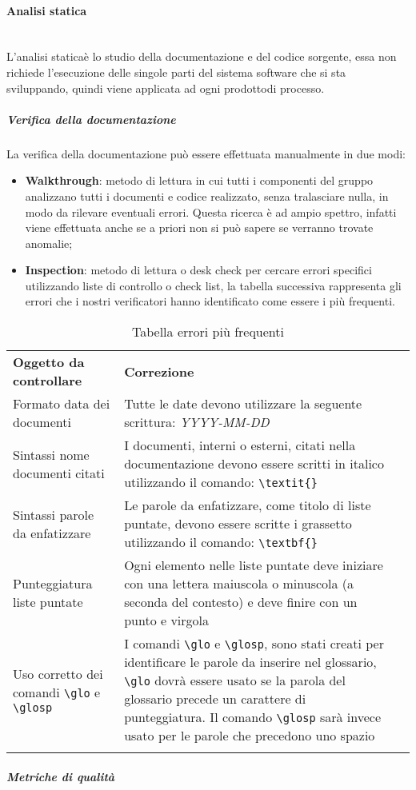 \paragraph{Analisi statica}\mbox{}\\ [1mm]
L'analisi statica\glosp è lo studio della documentazione e del codice sorgente, essa non richiede l'esecuzione delle singole parti del sistema software che si sta sviluppando, quindi viene applicata ad ogni prodotto\glosp di processo\glo.
\subparagraph*{Verifica della documentazione} 
La verifica della documentazione può essere effettuata manualmente in due modi:
\begin{itemize}
	\item \textbf{Walkthrough}: metodo di lettura in cui tutti i componenti del gruppo analizzano tutti i documenti e codice realizzato, senza tralasciare nulla, in modo da rilevare eventuali errori. Questa ricerca è ad ampio spettro, infatti viene effettuata anche se a priori non si può sapere se verranno trovate anomalie;
	\item \textbf{Inspection}: metodo di lettura o desk check per cercare errori specifici utilizzando liste di controllo o check list, la tabella successiva rappresenta gli errori che i nostri verificatori hanno identificato come essere i più frequenti.
\end{itemize}
\setcounter{table}{0}
\begin{longtable} {
		>{}p{55mm} 
		>{}p{55mm}
		>{}p{0mm}}
	\rowcolor{gray!50}
	\textbf{Oggetto da controllare} & \textbf{Correzione} & \TBstrut \\[2mm]
	Formato data dei documenti & Tutte le date devono utilizzare la seguente scrittura: \textit{YYYY-MM-DD}  &  \TBstrut \\[2mm]
	Sintassi nome documenti citati & I documenti, interni o esterni, citati nella documentazione devono essere scritti in italico utilizzando il comando: \verb|\textit{}|  &  \TBstrut \\[2mm]
	Sintassi parole da enfatizzare & Le parole da enfatizzare, come titolo di liste puntate, devono essere scritte i grassetto utilizzando il comando: \verb|\textbf{}|  &  \TBstrut \\[2mm]
	Punteggiatura liste puntate & Ogni elemento nelle liste puntate deve iniziare con una lettera maiuscola o minuscola (a seconda del contesto) e deve finire con un punto e virgola &  \TBstrut \\[2mm]
	Uso corretto dei comandi \verb|\glo| e \verb|\glosp| & I comandi \verb|\glo| e \verb|\glosp|, sono stati creati per identificare le parole da inserire nel glossario, \verb|\glo| dovrà essere usato se la parola del glossario precede un carattere di punteggiatura. Il comando \verb|\glosp| sarà invece usato per le parole che precedono uno spazio &  \TBstrut \\	[2mm]
	\rowcolor{white}
	\caption{Tabella errori più frequenti}
\end{longtable}
\subparagraph{Metriche di qualità}

